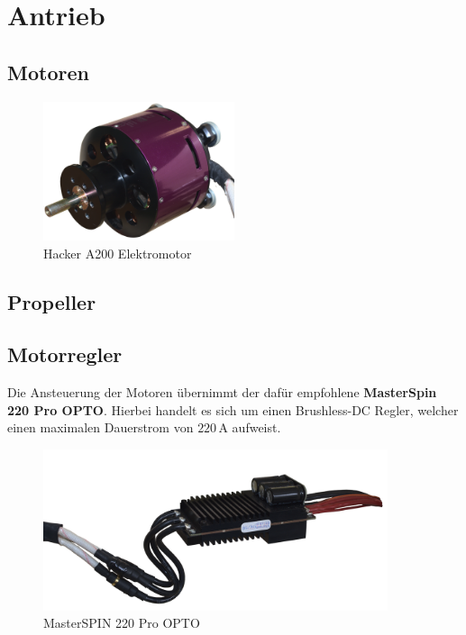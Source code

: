 \section{Antrieb}
\subsection{Motoren}
\begin{figure}[h]
    \centering
    \includegraphics[width=0.5\textwidth]{Fotos/Motor.png}
    \caption{Hacker A200 Elektromotor}
\end{figure}
\newpage
\subsection{Propeller}



\newpage
\subsection{Motorregler}
Die Ansteuerung der Motoren übernimmt der dafür empfohlene \textbf{MasterSpin 220 Pro OPTO}.
Hierbei handelt es sich um einen Brushless-DC Regler, welcher einen maximalen Dauerstrom von $220\,\mathrm{A}$ aufweist.
\begin{figure}[h]
    \centering
    \includegraphics[width=0.9\textwidth]{Fotos/MasterSpin_ohne_Halter.png}
    \caption{MasterSPIN 220 Pro OPTO}
\end{figure}
